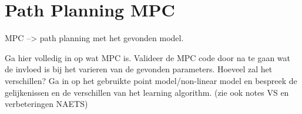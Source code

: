 \chapter{Path Planning MPC}
\label{cha:4}

MPC --> path planning met het gevonden model.

Ga hier volledig in op wat MPC is.
Valideer de MPC code door na te gaan wat de invloed is bij het varieren van de gevonden parameters.
Hoeveel zal het verschillen? Ga in op het gebruikte point model/non-linear model en bespreek de gelijkenissen en de verschillen van het learning algorithm. (zie ook notes VS en verbeteringen NAETS)
















